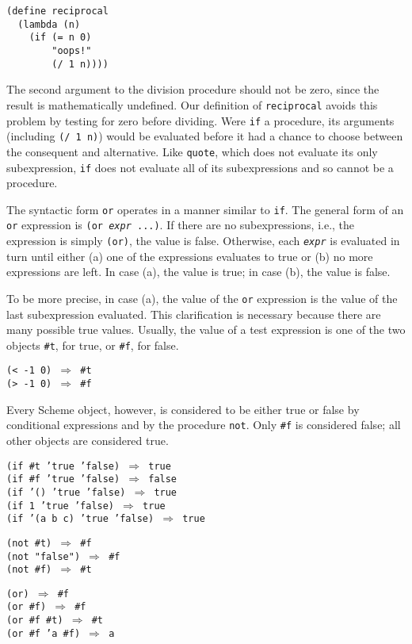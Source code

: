 \begin{alltt}
(define reciprocal
  (lambda (n)
    (if (= n 0)
        "oops!"
        (/ 1 n))))
\end{alltt}


The second argument to the division procedure should not be zero,
since the result is mathematically undefined.
Our definition of \texttt{reciprocal} avoids this problem by
testing for zero before dividing.
Were \texttt{if} a procedure, its arguments (including \texttt{(/ 1 n)})
would be evaluated before it had a chance to choose between the
consequent and alternative.
Like \texttt{quote}, which does not evaluate its only subexpression,
\texttt{if} does not evaluate all of its subexpressions and so cannot
be a procedure.


The syntactic form \label{start_s103}\texttt{or} operates in a manner similar to \texttt{if}.
The general form of an \texttt{or} expression is \texttt{(or \textit{expr} ...)}.
If there are no subexpressions, i.e., the expression is simply \texttt{(or)},
the value is false.
Otherwise, each \texttt{\textit{expr}} is evaluated in turn until either (a) one of
the expressions evaluates to true or (b) no more expressions are left.
In case (a), the value is true; in case (b), the value is false.


To be more precise, in case (a), the value of the \texttt{or}
expression is the value of the last subexpression evaluated.
This clarification is necessary because there are many possible true
values.
Usually, the value of a test expression is one of the two objects
\label{start_s104}\texttt{\#{}t}, for true, or \label{start_s105}\texttt{\#{}f}, for false.


\begin{alltt}
(\textless{} -1 0) \(\Rightarrow\) \#{}t
(\textgreater{} -1 0) \(\Rightarrow\) \#{}f
\end{alltt}


Every Scheme object, however, is considered to be either \label{start_s106}true
or \label{start_s107}false by conditional expressions and by
the procedure \texttt{not}.
Only \texttt{\#{}f} is considered false; all other objects are considered
true.


\begin{alltt}
(if \#{}t 'true 'false) \(\Rightarrow\) true
(if \#{}f 'true 'false) \(\Rightarrow\) false
(if '() 'true 'false) \(\Rightarrow\) true
(if 1 'true 'false) \(\Rightarrow\) true
(if '(a b c) 'true 'false) \(\Rightarrow\) true

(not \#{}t) \(\Rightarrow\) \#{}f
(not "false") \(\Rightarrow\) \#{}f
(not \#{}f) \(\Rightarrow\) \#{}t

(or) \(\Rightarrow\) \#{}f
(or \#{}f) \(\Rightarrow\) \#{}f
(or \#{}f \#{}t) \(\Rightarrow\) \#{}t
(or \#{}f 'a \#{}f) \(\Rightarrow\) a
\end{alltt}


